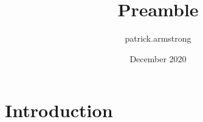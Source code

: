 \documentclass{article}
\title{Preamble}
\author{patrick.armstrong }
\date{December 2020}
\begin{document}
\maketitle

\section{Introduction}
\end{document}
